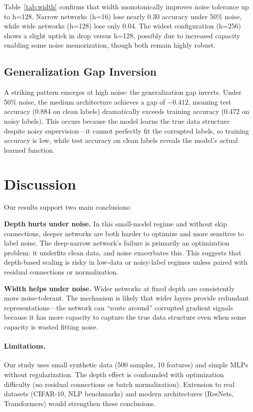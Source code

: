 \documentclass[11pt,a4paper]{article}
\begin{document}
Table~\ref{tab:width} confirms that width monotonically improves noise tolerance up to h=128.
Narrow networks (h=16) lose nearly 0.30 accuracy under 50\% noise, while wide networks (h=128) lose only 0.04.
The widest configuration (h=256) shows a slight uptick in drop versus h=128, possibly due to increased capacity enabling some noise memorization, though both remain highly robust.

\subsection{Generalization Gap Inversion}

A striking pattern emerges at high noise: the generalization gap inverts.
Under 50\% noise, the medium architecture achieves a gap of $-0.412$, meaning test accuracy (0.884 on clean labels) dramatically exceeds training accuracy (0.472 on noisy labels).
This occurs because the model learns the true data structure despite noisy supervision—it cannot perfectly fit the corrupted labels, so training accuracy is low, while test accuracy on clean labels reveals the model's actual learned function.

\section{Discussion}

Our results support two main conclusions:

\textbf{Depth hurts under noise.}
In this small-model regime and without skip connections, deeper networks are both harder to optimize and more sensitive to label noise.
The deep-narrow network's failure is primarily an optimization problem: it underfits clean data, and noise exacerbates this.
This suggests that depth-based scaling is risky in low-data or noisy-label regimes unless paired with residual connections or normalization.

\textbf{Width helps under noise.}
Wider networks at fixed depth are consistently more noise-tolerant.
The mechanism is likely that wider layers provide redundant representations—the network can ``route around'' corrupted gradient signals because it has more capacity to capture the true data structure even when some capacity is wasted fitting noise.

\paragraph{Limitations.}
Our study uses small synthetic data (500 samples, 10 features) and simple MLPs without regularization.
The depth effect is confounded with optimization difficulty (no residual connections or batch normalization).
Extension to real datasets (CIFAR-10, NLP benchmarks) and modern architectures (ResNets, Transformers) would strengthen these conclusions.
\end{document}
